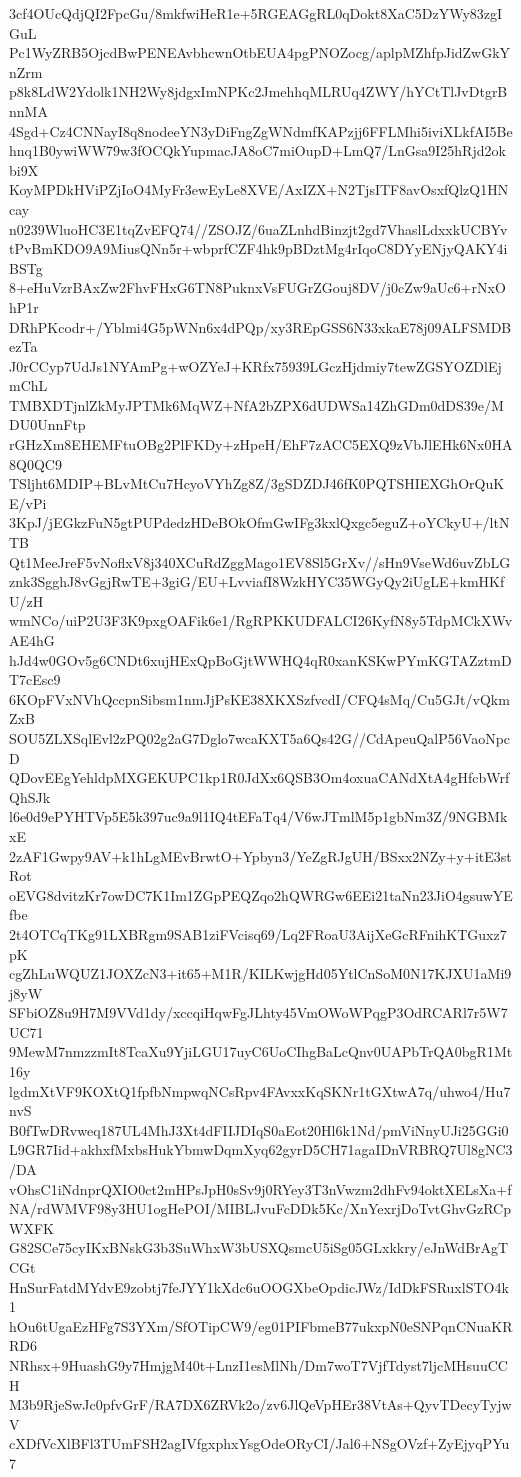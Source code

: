 3cf4OUcQdjQI2FpcGu/8mkfwiHeR1e+5RGEAGgRL0qDokt8XaC5DzYWy83zgIGuL
Pc1WyZRB5OjcdBwPENEAvbhcwnOtbEUA4pgPNOZocg/aplpMZhfpJidZwGkYnZrm
p8k8LdW2Ydolk1NH2Wy8jdgxImNPKc2JmehhqMLRUq4ZWY/hYCtTlJvDtgrBnnMA
4Sgd+Cz4CNNayI8q8nodeeYN3yDiFngZgWNdmfKAPzjj6FFLMhi5iviXLkfAI5Be
hnq1B0ywiWW79w3fOCQkYupmacJA8oC7miOupD+LmQ7/LnGsa9I25hRjd2okbi9X
KoyMPDkHViPZjIoO4MyFr3ewEyLe8XVE/AxIZX+N2TjsITF8avOsxfQlzQ1HNcay
n0239WluoHC3E1tqZvEFQ74//ZSOJZ/6uaZLnhdBinzjt2gd7VhaslLdxxkUCBYv
tPvBmKDO9A9MiusQNn5r+wbprfCZF4hk9pBDztMg4rIqoC8DYyENjyQAKY4iBSTg
8+eHuVzrBAxZw2FhvFHxG6TN8PuknxVsFUGrZGouj8DV/j0cZw9aUc6+rNxOhP1r
DRhPKcodr+/Yblmi4G5pWNn6x4dPQp/xy3REpGSS6N33xkaE78j09ALFSMDBezTa
J0rCCyp7UdJs1NYAmPg+wOZYeJ+KRfx75939LGczHjdmiy7tewZGSYOZDlEjmChL
TMBXDTjnlZkMyJPTMk6MqWZ+NfA2bZPX6dUDWSa14ZhGDm0dDS39e/MDU0UnnFtp
rGHzXm8EHEMFtuOBg2PlFKDy+zHpeH/EhF7zACC5EXQ9zVbJlEHk6Nx0HA8Q0QC9
TSljht6MDIP+BLvMtCu7HcyoVYhZg8Z/3gSDZDJ46fK0PQTSHIEXGhOrQuKE/vPi
3KpJ/jEGkzFuN5gtPUPdedzHDeBOkOfmGwIFg3kxlQxgc5eguZ+oYCkyU+/ltNTB
Qt1MeeJreF5vNoflxV8j340XCuRdZggMago1EV8Sl5GrXv//sHn9VseWd6uvZbLG
znk3SgghJ8vGgjRwTE+3giG/EU+LvviafI8WzkHYC35WGyQy2iUgLE+kmHKfU/zH
wmNCo/uiP2U3F3K9pxgOAFik6e1/RgRPKKUDFALCI26KyfN8y5TdpMCkXWvAE4hG
hJd4w0GOv5g6CNDt6xujHExQpBoGjtWWHQ4qR0xanKSKwPYmKGTAZztmDT7cEsc9
6KOpFVxNVhQccpnSibsm1nmJjPsKE38XKXSzfvcdI/CFQ4sMq/Cu5GJt/vQkmZxB
SOU5ZLXSqlEvl2zPQ02g2aG7Dglo7wcaKXT5a6Qs42G//CdApeuQalP56VaoNpcD
QDovEEgYehldpMXGEKUPC1kp1R0JdXx6QSB3Om4oxuaCANdXtA4gHfcbWrfQhSJk
l6e0d9ePYHTVp5E5k397uc9a9l1IQ4tEFaTq4/V6wJTmlM5p1gbNm3Z/9NGBMkxE
2zAF1Gwpy9AV+k1hLgMEvBrwtO+Ypbyn3/YeZgRJgUH/BSxx2NZy+y+itE3stRot
oEVG8dvitzKr7owDC7K1Im1ZGpPEQZqo2hQWRGw6EEi21taNn23JiO4gsuwYEfbe
2t4OTCqTKg91LXBRgm9SAB1ziFVcisq69/Lq2FRoaU3AijXeGcRFnihKTGuxz7pK
cgZhLuWQUZ1JOXZcN3+it65+M1R/KILKwjgHd05YtlCnSoM0N17KJXU1aMi9j8yW
SFbiOZ8u9H7M9VVd1dy/xccqiHqwFgJLhty45VmOWoWPqgP3OdRCARl7r5W7UC71
9MewM7nmzzmIt8TcaXu9YjiLGU17uyC6UoCIhgBaLcQnv0UAPbTrQA0bgR1Mt16y
lgdmXtVF9KOXtQ1fpfbNmpwqNCsRpv4FAvxxKqSKNr1tGXtwA7q/uhwo4/Hu7nvS
B0fTwDRvweq187UL4MhJ3Xt4dFIIJDIqS0aEot20Hl6k1Nd/pmViNnyUJi25GGi0
L9GR7Iid+akhxfMxbsHukYbmwDqmXyq62gyrD5CH71agaIDnVRBRQ7Ul8gNC3/DA
vOhsC1iNdnprQXIO0ct2mHPsJpH0sSv9j0RYey3T3nVwzm2dhFv94oktXELsXa+f
NA/rdWMVF98y3HU1ogHePOI/MIBLJvuFcDDk5Kc/XnYexrjDoTvtGhvGzRCpWXFK
G82SCe75cyIKxBNskG3b3SuWhxW3bUSXQsmcU5iSg05GLxkkry/eJnWdBrAgTCGt
HnSurFatdMYdvE9zobtj7feJYY1kXdc6uOOGXbeOpdicJWz/IdDkFSRuxlSTO4k1
hOu6tUgaEzHFg7S3YXm/SfOTipCW9/eg01PIFbmeB77ukxpN0eSNPqnCNuaKRRD6
NRhsx+9HuashG9y7HmjgM40t+LnzI1esMlNh/Dm7woT7VjfTdyst7ljcMHsuuCCH
M3b9RjeSwJc0pfvGrF/RA7DX6ZRVk2o/zv6JlQeVpHEr38VtAs+QyvTDecyTyjwV
cXDfVcXlBFl3TUmFSH2agIVfgxphxYsgOdeORyCI/Jal6+NSgOVzf+ZyEjyqPYu7
